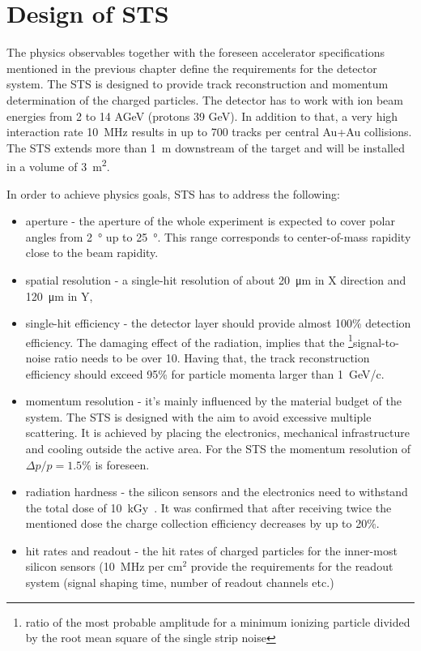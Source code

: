 \section{Design of STS}


The physics observables together with the foreseen accelerator specifications mentioned in the previous chapter define the requirements for the detector system. The \gls{STS} is designed to provide track reconstruction and momentum determination of the charged particles. The detector has to work with ion beam energies from 2 to 14 AGeV (protons 39 GeV). In addition to that, a very high interaction rate 10~MHz results in up to 700 tracks per central Au+Au collisions. The \gls{STS} extends more than \SI{1}{\metre} downstream of the target and will be installed in a volume of \SI{3}{\square\metre}. 

In order to achieve physics goals, \gls{STS} has to address the following:
\begin{itemize}
    \item  aperture - the aperture of the whole experiment is expected to cover polar angles from \SI{2}{\degree} up to \SI{25}{\degree}. This range corresponds to center-of-mass rapidity close to the beam rapidity. 
    \item spatial resolution - a single-hit resolution of about \SI{20}{\micro\metre} in X direction and \SI{120}{\micro\metre} in Y, 
    \item single-hit efficiency - the detector layer should provide almost 100\% detection efficiency. The damaging effect of the radiation, implies that the \footnote{ratio of the most probable amplitude for a minimum ionizing particle divided by the root mean square of the single strip noise}{signal-to-noise} ratio needs to be over 10. Having that, the track reconstruction efficiency should exceed 95\% for particle momenta larger than 1~GeV/c. 
    \item momentum resolution - it's mainly influenced by the material budget of the system. The \gls{STS} is designed with the aim to avoid excessive multiple scattering. It is achieved by placing the electronics, mechanical infrastructure and cooling outside the active area. For the \gls{STS} the momentum resolution of $\Delta p/p = 1.5\%$ is foreseen. 
    \item radiation hardness - the silicon sensors and the electronics need to withstand the total dose of 10~kGy~\cite{Heuser:54798}. It was confirmed that after receiving twice the mentioned dose the charge collection efficiency decreases by up to 20\%. 
    \item hit rates and readout - the hit rates of charged particles for the inner-most silicon sensors (10~MHz per $\mathrm{cm^{2}}$ provide the requirements for the readout system (signal shaping time, number of readout channels etc.)
\end{itemize}

